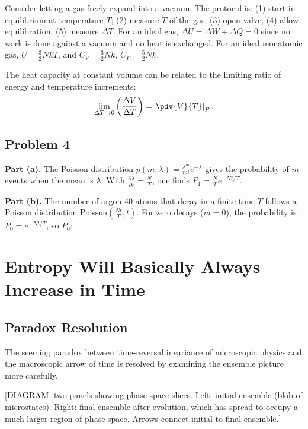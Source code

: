 Consider letting a gas freely expand into a vacuum. The protocol is: (1) start in equilibrium at temperature $T$; (2) measure $T$ of the gas; (3) open valve; (4) allow equilibration; (5) measure $\Delta T$. For an ideal gas, $\Delta U = \Delta W + \Delta Q = 0$ since no work is done against a vacuum and no heat is exchanged. For an ideal monatomic gas, $U = \frac{3}{2}NkT$, and $C_V = \frac{3}{2}Nk$, $C_P = \frac{5}{2}Nk$.

The heat capacity at constant volume can be related to the limiting ratio of energy and temperature increments:
\begin{equation}
    \lim_{\Delta T \to 0}\left(\frac{\Delta V}{\Delta T}\right) = \left.\pdv{V}{T}\right|_P.
\end{equation}

\subsection*{Problem 4}

\textbf{Part (a).} The Poisson distribution $p(m, \lambda) = \frac{\lambda^m}{m!}e^{-\lambda}$ gives the probability of $m$ events when the mean is $\lambda$. With $\frac{\partial \lambda}{\partial t} = \frac{N}{T}$, one finds $P_1 = \frac{N}{T}e^{-N t/T}$.

\textbf{Part (b).} The number of argon-40 atoms that decay in a finite time $T$ follows a Poisson distribution $\text{Poisson}\!\left(\frac{N t}{T}, t\right)$. For zero decays ($m = 0$), the probability is $P_0 = e^{-N t/T}$, so $P_0$:


\section{Entropy Will Basically Always Increase in Time}

\subsection{Paradox Resolution}

The seeming paradox between time-reversal invariance of microscopic physics and the macroscopic arrow of time is resolved by examining the ensemble picture more carefully.

\begin{center}[DIAGRAM: two panels showing phase-space slices. Left: initial ensemble (blob of microstates). Right: final ensemble after evolution, which has spread to occupy a much larger region of phase space. Arrows connect initial to final ensemble.]\end{center}

